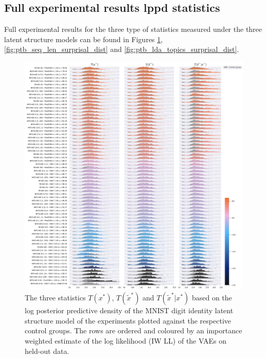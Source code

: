 \subsection{Full experimental results lppd statistics}

Full experimental results for the three type of statistics measured under the three latent structure models can be found in Figures \ref{fig:mnist_surprisal_dist}, \ref{fig:ptb_seq_len_surprisal_dist} and \ref{fig:ptb_lda_topics_surprisal_dist}.

\begin{figure}[!htb]
    \centering
    \includegraphics[width=\textwidth]{images/surprisal_dists/mnist_surprisal_dist.png}
    \caption{The three statistics $T(x^*)$, $T(\tilde x^*)$ and $T(\tilde x^*|x^*)$ based on the log posterior predictive density of the MNIST digit identity latent structure model of the experiments plotted against the respective control groups. The rows are ordered and coloured by an importance weighted estimate of the log likelihood (IW LL) of the VAEs on held-out data.}
    \label{fig:mnist_surprisal_dist}
\end{figure}

